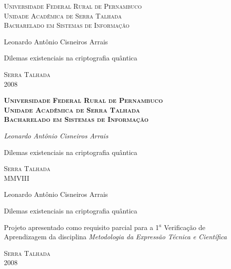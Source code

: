 \documentclass[a4paper,12pt]{article}
\begin{document}
\begin{titlepage}
\begin{center}

{\scshape
Universidade Federal Rural de Pernambuco \\
Unidade Acadêmica de Serra Talhada \\
Bacharelado em Sistemas de Informação
} 
\vfill

{\large Leonardo Antônio Cisneiros Arrais} \vspace{7pt}

\vfill

{\Huge
Dilemas existenciais na criptografia quântica}

\vfill\vfill


{\scshape Serra Talhada \\ 2008}


\end{center}

\renewcommand{\bfdefault}{sb}
\end{titlepage}



\begin{titlepage}
\begin{flushright}

{\sffamily\scshape\bfseries
Universidade Federal Rural de Pernambuco \\
Unidade Acadêmica de Serra Talhada \\
Bacharelado em Sistemas de Informação
} 
\vfill

\emph{\large Leonardo Antônio Cisneiros Arrais} \vspace{7pt}

{\fontsize{32}{34}\selectfont
Dilemas existenciais na criptografia quântica}

\vfill


{\sffamily\scshape Serra Talhada \\ MMVIII}


\end{flushright}
\end{titlepage}

\begin{titlepage}
\begin{center}

\vfill

{\large Leonardo Antônio Cisneiros Arrais} \vspace{7pt}

\vfill\vfill

{\Huge
Dilemas existenciais na criptografia quântica}

\vfill

\begin{flushright}
\parbox{0.4\textwidth}{\small
Projeto apresentado como requisito parcial
para a 1$^{a}$ Verificação de Aprendizagem da disciplina
\emph{Metodologia da Expressão Técnica e Científica}
} 
\end{flushright}

\vfill


{\scshape Serra Talhada \\ 2008}


\end{center} 
\end{titlepage}
\end{document}
